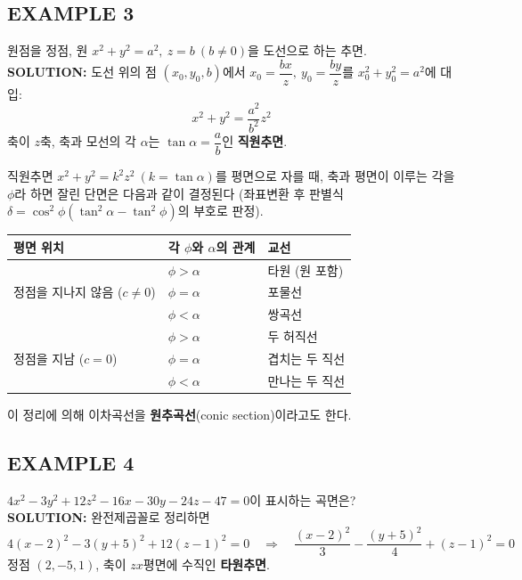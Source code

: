 \documentclass{article}
\theoremstyle{mystyle}
\begin{document}
\subsection*{EXAMPLE 3}
원점을 정점, 원 \(x^2+y^2=a^2,\ z=b\ (b\ne0)\)을 도선으로 하는 추면.\\
\textbf{SOLUTION:} 도선 위의 점 \((x_0,y_0,b)\)에서 \(x_0=\dfrac{bx}{z},\ y_0=\dfrac{by}{z}\)를 \(x_0^2+y_0^2=a^2\)에 대입:
\[
x^2+y^2=\frac{a^2}{b^2}z^2
\]
축이 \(z\)축, 축과 모선의 각 \(\alpha\)는 \(\tan\alpha=\dfrac{a}{b}\)인 \textbf{직원추면}.

\begin{tcolorbox}[
    colback=red!4,
    colframe=red!60!black,
    title=정리 1: 직원추면과 평면의 교선,
    fonttitle=\bfseries,
    boxrule=0.5mm,
    arc=3mm
    ]
    직원추면 \(x^2+y^2=k^2z^2\ (k=\tan\alpha)\)를 평면으로 자를 때, 축과 평면이 이루는 각을 \(\phi\)라 하면 잘린 단면은 다음과 같이 결정된다 (좌표변환 후 판별식 \(\delta=\cos^2\phi(\tan^2\alpha-\tan^2\phi)\)의 부호로 판정).
\end{tcolorbox}


\begin{center}
\renewcommand{\arraystretch}{1.3}
\begin{tabular}{|l|l|l|}
\hline
평면 위치 & 각 \(\phi\)와 \(\alpha\)의 관계 & 교선 \\
\hline
\multirow{3}{*}{정점을 지나지 않음 (\(c\ne0\))} & \(\phi>\alpha\) & 타원 (원 포함) \\
 & \(\phi=\alpha\) & 포물선 \\
 & \(\phi<\alpha\) & 쌍곡선 \\
\hline
\multirow{3}{*}{정점을 지남 (\(c=0\))} & \(\phi>\alpha\) & 두 허직선 \\
 & \(\phi=\alpha\) & 겹치는 두 직선 \\
 & \(\phi<\alpha\) & 만나는 두 직선 \\
\hline
\end{tabular}
\end{center}
이 정리에 의해 이차곡선을 \textbf{원추곡선}(conic section)이라고도 한다.

\subsection*{EXAMPLE 4}
\(4x^2-3y^2+12z^2-16x-30y-24z-47=0\)이 표시하는 곡면은?\\
\textbf{SOLUTION:} 완전제곱꼴로 정리하면
\[
4(x-2)^2-3(y+5)^2+12(z-1)^2=0
\quad\Longrightarrow\quad
\frac{(x-2)^2}{3}-\frac{(y+5)^2}{4}+(z-1)^2=0
\]
정점 \((2,-5,1)\), 축이 \(zx\)평면에 수직인 \textbf{타원추면}.
\end{document}
